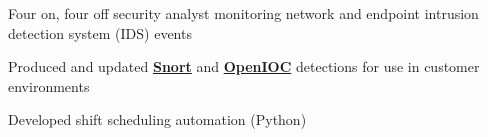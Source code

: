 \documentclass[letterpaper]{deedy-resume} %
\begin{document}
\begin{minipage}[t]{0.66\textwidth}
\sectionspace %



\begin{tightitemize}
\item Four on, four off security analyst monitoring network and endpoint intrusion detection system (IDS) events
\item Produced and updated \textbf{\href{https://www.snort.org/}{Snort}} and \textbf{\href{https://github.com/fireeye/OpenIOC_1.1}{OpenIOC}} detections for use in customer environments
\item Developed shift scheduling automation (Python)
\end{tightitemize}

\sectionspace %




\end{minipage} %








\end{document}
